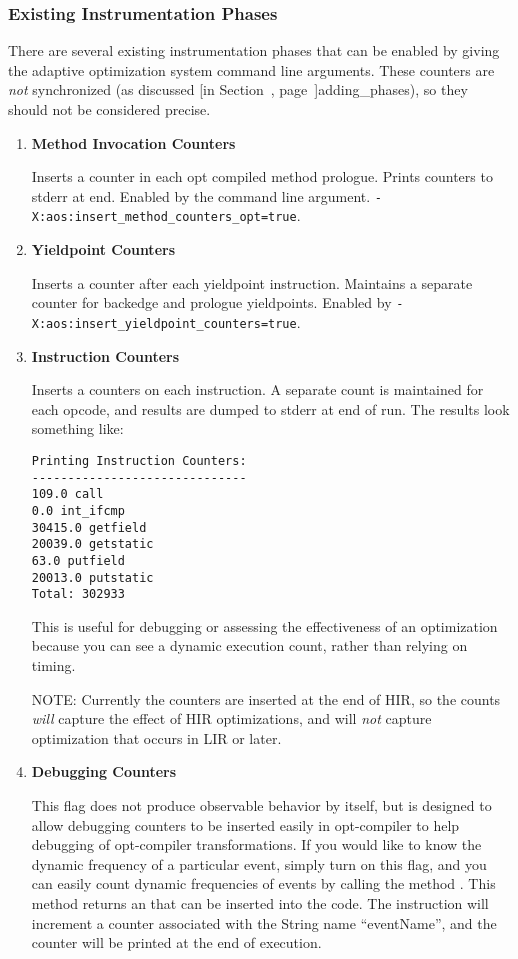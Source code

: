 \subsubsection{Existing Instrumentation Phases}
\label{existing_phases}
There are several existing instrumentation phases that can be enabled
by giving the adaptive optimization system command line
arguments. These counters are {\em not} synchronized (as discussed [in
Section~\Ref, page~\Pageref]{adding_phases}), so they should not be considered
precise.
\begin{enumerate}
\item {\bf Method Invocation Counters} 

Inserts a counter in each opt compiled method prologue.  Prints
counters to stderr at end. Enabled by the command line argument.
{\tt -X:aos:insert\_method\_counters\_opt=true}.

\item {\bf Yieldpoint Counters}  

Inserts a counter after each yieldpoint instruction.  Maintains a
separate counter for backedge and prologue yieldpoints. Enabled by 
{\tt -X:aos:insert\_yieldpoint\_counters=true}.

\item {\bf Instruction Counters}  

Inserts a counters on each instruction.  A separate count is
maintained for each opcode, and results are dumped to stderr at end of
run. The results look something like:

\begin{verbatim}
Printing Instruction Counters:
------------------------------
109.0 call
0.0 int_ifcmp
30415.0 getfield
20039.0 getstatic
63.0 putfield
20013.0 putstatic
Total: 302933
\end{verbatim}

This is useful for debugging or assessing the effectiveness
of an optimization because you can see a dynamic execution count, rather
than relying on timing.  

NOTE: Currently the counters are inserted at the end of HIR, so the
counts {\em will} capture the effect of HIR optimizations, and will
{\em not} capture optimization that occurs in LIR or later.  

\item {\bf Debugging Counters}  

This flag does not produce observable behavior by itself, but is
designed to allow debugging counters to be inserted easily in
opt-compiler to help debugging of opt-compiler transformations.
If you would like to know the dynamic frequency of a particular
event, simply turn on this flag, and you can easily count dynamic
frequencies of events by calling the method
.  This method
returns an 
that can be inserted into the
code.  The instruction will increment a counter associated with
the String name ``eventName'', and the counter will be printed at the
end of execution.


\end{enumerate}
